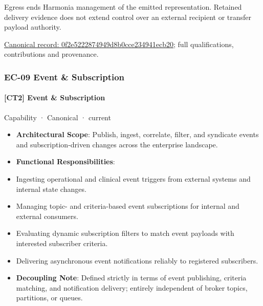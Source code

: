 Egress ends Harmonia management of the emitted representation. Retained delivery evidence does not extend control over an external recipient or transfer payload authority.


{\footnotesize \href{../../../../continuum/strategy/capability/0f2e5222874949d8b0cce234941ecb20.md}{Canonical record: 0f2e5222874949d8b0cce234941ecb20}; full qualifications, contributions and provenance.}\par
\subsubsection{EC-09 Event \& Subscription}

\paragraph{[CT2] Event \& Subscription}

\label{element:b768b129971e4bf5bccc03d33d2fcb4e}
{\small Capability · Canonical · current}\par

\begin{itemize}


\item \textbf{Architectural Scope}: Publish, ingest, correlate, filter, and syndicate events and subscription-driven changes across the enterprise landscape.

\item \textbf{Functional Responsibilities}:

\item Ingesting operational and clinical event triggers from external systems and internal state changes.

\item Managing topic- and criteria-based event subscriptions for internal and external consumers.

\item Evaluating dynamic subscription filters to match event payloads with interested subscriber criteria.

\item Delivering asynchronous event notifications reliably to registered subscribers.

\item \textbf{Decoupling Note}: Defined strictly in terms of event publishing, criteria matching, and notification delivery; entirely independent of broker topics, partitions, or queues.

\end{itemize}


